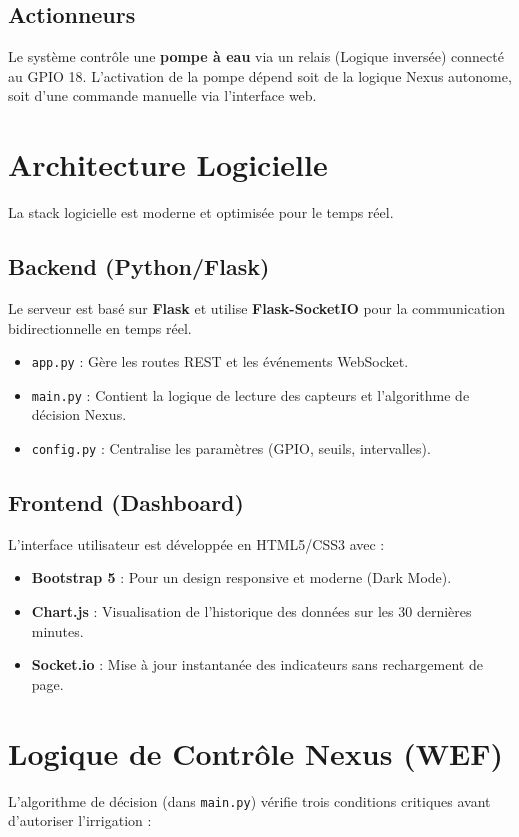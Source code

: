 \documentclass[12pt,a4paper]{article}
\begin{document}
\subsection{Actionneurs}
Le système contrôle une \textbf{pompe à eau} via un relais (Logique inversée) connecté au GPIO 18. L'activation de la pompe dépend soit de la logique Nexus autonome, soit d'une commande manuelle via l'interface web.

\section{Architecture Logicielle}
La stack logicielle est moderne et optimisée pour le temps réel.

\subsection{Backend (Python/Flask)}
Le serveur est basé sur \textbf{Flask} et utilise \textbf{Flask-SocketIO} pour la communication bidirectionnelle en temps réel.
\begin{itemize}
    \item \texttt{app.py} : Gère les routes REST et les événements WebSocket.
    \item \texttt{main.py} : Contient la logique de lecture des capteurs et l'algorithme de décision Nexus.
    \item \texttt{config.py} : Centralise les paramètres (GPIO, seuils, intervalles).
\end{itemize}

\subsection{Frontend (Dashboard)}
L'interface utilisateur est développée en HTML5/CSS3 avec :
\begin{itemize}
    \item \textbf{Bootstrap 5} : Pour un design responsive et moderne (Dark Mode).
    \item \textbf{Chart.js} : Visualisation de l'historique des données sur les 30 dernières minutes.
    \item \textbf{Socket.io} : Mise à jour instantanée des indicateurs sans rechargement de page.
\end{itemize}

\section{Logique de Contrôle Nexus (WEF)}
L'algorithme de décision (dans \texttt{main.py}) vérifie trois conditions critiques avant d'autoriser l'irrigation :
\end{document}
